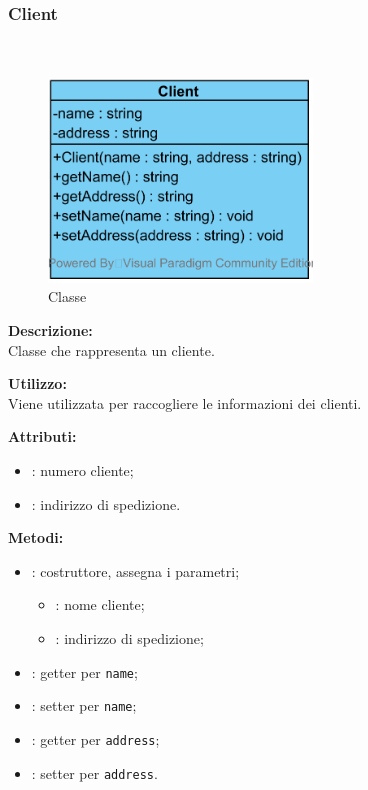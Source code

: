 \subsubsection{Client}
\paragraph[::Client]{\class}\mbox{}\\ \label{\class}
\begin{figure}[H]
	\centering
	\includegraphics[width=7cm]{./diagrammi/demo/client/customer/client.png}
	\caption{Classe \class}
\end{figure}
\textbf{Descrizione:}\\
Classe che rappresenta un cliente.

\textbf{Utilizzo:}\\
Viene utilizzata per raccogliere le informazioni dei clienti.

%

\textbf{Attributi:}
\begin{itemize}
	\item {}: numero cliente;
	\item {}: indirizzo di spedizione.
\end{itemize}

\textbf{Metodi:}
\begin{itemize}
	\item {}: costruttore, assegna i parametri;
	\begin{itemize}
		\item {}: nome cliente;
		\item {}: indirizzo di spedizione;
	\end{itemize}
	\item {}: getter per \texttt{name};
	\item {}: setter per \texttt{name};
	\item {}: getter per \texttt{address};
	\item {}: setter per \texttt{address}.
\end{itemize}

